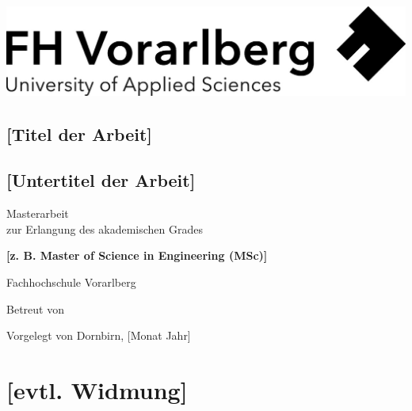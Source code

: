 \documentclass[a4paper,12pt,twoside]{scrreprt}
\begin{document}
\cleardoublepage
\thispagestyle{empty}
\begin{titlepage}
  \begin{flushright}
  \includegraphics[width=0.4\linewidth]{Logo-A3}
  \end{flushright}
  \begin{flushleft}
  \section*{[Titel der Arbeit]}
  \subsection*{[Untertitel der Arbeit]}
  \vspace{1cm}
  
  Masterarbeit\\
  zur Erlangung des akademischen Grades
  \vspace{0.5cm}
  
  \textbf{[z. B. Master of Science in Engineering (MSc)]}

  \vspace{1cm}
  Fachhochschule Vorarlberg

  \vspace{0.5cm}
  
  Betreut von
  
  \vspace{0.5cm}
  
  Vorgelegt von\newline
  Dornbirn, [Monat Jahr]
  \end{flushleft}
\end{titlepage}


\newpage
\section*{[evtl. Widmung]}   %
\end{document}
